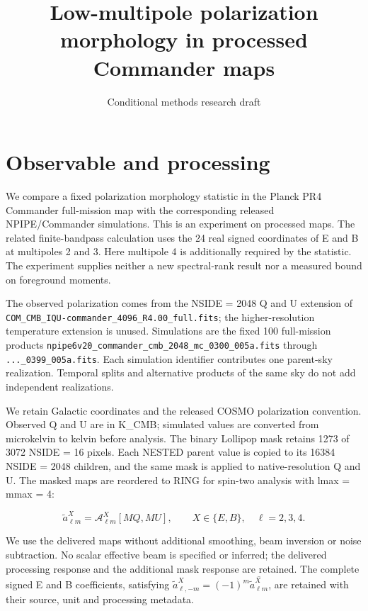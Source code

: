\documentclass[aps,prd,reprint,onecolumn,nofootinbib]{revtex4-2}
\begin{document}
\title{Low-multipole polarization morphology in processed Commander maps}
\author{Conditional methods research draft}\noaffiliation
\maketitle
\hypertarget{observable-and-processing}{%
\section{Observable and processing}\label{observable-and-processing}}

We compare a fixed polarization morphology statistic in the Planck PR4
Commander full-mission map with the corresponding released
NPIPE/Commander simulations. This is an experiment on processed maps.
The related finite-bandpass calculation uses the 24 real signed
coordinates of E and B at multipoles 2 and 3. Here multipole 4 is
additionally required by the statistic. The experiment supplies neither
a new spectral-rank result nor a measured bound on foreground moments.

The observed polarization comes from the NSIDE = 2048 Q and U extension
of \nolinkurl{COM_CMB_IQU-commander_4096_R4.00_full.fits}; the
higher-resolution temperature extension is unused. Simulations are the
fixed 100 full-mission products
\nolinkurl{npipe6v20_commander_cmb_2048_mc_0300_005a.fits} through
\nolinkurl{..._0399_005a.fits}. Each simulation identifier contributes
one parent-sky realization. Temporal splits and alternative products of
the same sky do not add independent realizations.

We retain Galactic coordinates and the released COSMO polarization
convention. Observed Q and U are in K\_CMB; simulated values are
converted from microkelvin to kelvin before analysis. The binary
Lollipop mask retains 1273 of 3072 NSIDE = 16 pixels. Each NESTED parent
value is copied to its 16384 NSIDE = 2048 children, and the same mask is
applied to native-resolution Q and U. The masked maps are reordered to
RING for spin-two analysis with lmax = mmax = 4:

\[
 \widetilde a^X_{\ell m}=\mathcal A^X_{\ell m}[M Q,M U],
 \qquad X\in\{E,B\},\quad \ell=2,3,4.
\]

We use the delivered maps without additional smoothing, beam inversion
or noise subtraction. No scalar effective beam is specified or inferred;
the delivered processing response and the additional mask response are
retained. The complete signed E and B coefficients, satisfying
\(\widetilde a^X_{\ell,-m}=(-1)^m\overline{\widetilde a^X_{\ell m}}\),
are retained with their source, unit and processing metadata.
\end{document}
